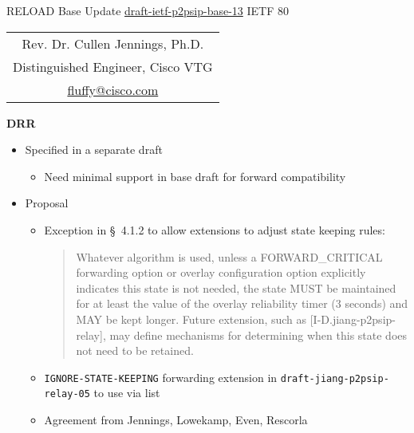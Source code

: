 \documentclass[helvetica]{seminar}
\newcommand{\heading}[1]{%
  \begin{center} 
    \large\bf 
    #1 
  \end{center} 
  \vspace{.4 in}}
\begin{document}
\begin{slide}
\begin{center}
\vspace{1 in}
\LARGE{{\bf}RELOAD Base Update}
\large{\url{draft-ietf-p2psip-base-13}}
\vspace{.2in}
\large{{IETF 80}} \\
\vspace{3em}
\large{
\begin{tabular}{c}
Rev. Dr. Cullen Jennings, Ph.D. \\
Distinguished Engineer, Cisco VTG\\
\url{fluffy@cisco.com}
\end{tabular}
}
\end{center}

\end{slide}


\centerslidesfalse 





\begin{slide}
\heading{DRR}

\vspace{-.4in}
\begin{itemize}
\item Specified in a separate draft
  \begin{itemize}
  \item Need minimal support in base draft for forward compatibility
  \end{itemize}

\item Proposal
  \begin{itemize}
  \item Exception in \S\ 4.1.2 to allow extensions to adjust state keeping rules:
    \small{
    \begin{quote}
      Whatever algorithm is used, unless a FORWARD\_CRITICAL forwarding
      option or overlay configuration option explicitly indicates this
      state is not needed, the state MUST be maintained for at least the
      value of the overlay reliability timer (3 seconds) and MAY be kept
      longer.  Future extension, such as [I-D.jiang-p2psip-relay], may
      define mechanisms for determining when this state does not need to be
      retained.
 \end{quote}
}
  \item \verb^IGNORE-STATE-KEEPING^ forwarding extension in \verb^draft-jiang-p2psip-relay-05^ to use via list
  \item Agreement from Jennings, Lowekamp, Even, Rescorla
  \end{itemize}
\end{itemize}
                

\end{slide}
\end{document}
